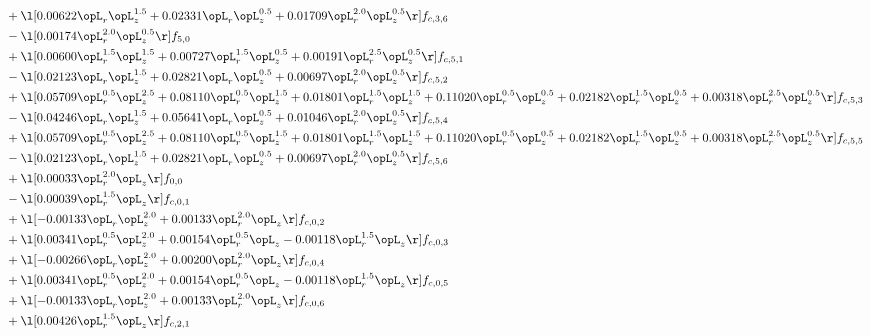 \begin{alignat}{2}
& + \l[  0.00622 \opL_r \opL_z^{1.5} +  0.02331 \opL_r \opL_z^{0.5} +  0.01709 \opL_r^{2.0} \opL_z^{0.5}  \r] f_{c,3,6} \nonumber \\ 
& - \l[  0.00174 \opL_r^{2.0} \opL_z^{0.5}  \r] f_{5,0} \nonumber \\ 
& + \l[  0.00600 \opL_r^{1.5} \opL_z^{1.5} +  0.00727 \opL_r^{1.5} \opL_z^{0.5} +  0.00191 \opL_r^{2.5} \opL_z^{0.5}  \r] f_{c,5,1} \nonumber \\ 
& - \l[  0.02123 \opL_r \opL_z^{1.5} +  0.02821 \opL_r \opL_z^{0.5} +  0.00697 \opL_r^{2.0} \opL_z^{0.5}  \r] f_{c,5,2} \nonumber \\ 
& + \l[  0.05709 \opL_r^{0.5} \opL_z^{2.5} +  0.08110 \opL_r^{0.5} \opL_z^{1.5} +  0.01801 \opL_r^{1.5} \opL_z^{1.5} +  0.11020 \opL_r^{0.5} \opL_z^{0.5} +  0.02182 \opL_r^{1.5} \opL_z^{0.5} +  0.00318 \opL_r^{2.5} \opL_z^{0.5}  \r] f_{c,5,3} \nonumber \\ 
& - \l[  0.04246 \opL_r \opL_z^{1.5} +  0.05641 \opL_r \opL_z^{0.5} +  0.01046 \opL_r^{2.0} \opL_z^{0.5}  \r] f_{c,5,4} \nonumber \\ 
& + \l[  0.05709 \opL_r^{0.5} \opL_z^{2.5} +  0.08110 \opL_r^{0.5} \opL_z^{1.5} +  0.01801 \opL_r^{1.5} \opL_z^{1.5} +  0.11020 \opL_r^{0.5} \opL_z^{0.5} +  0.02182 \opL_r^{1.5} \opL_z^{0.5} +  0.00318 \opL_r^{2.5} \opL_z^{0.5}  \r] f_{c,5,5} \nonumber \\ 
& - \l[  0.02123 \opL_r \opL_z^{1.5} +  0.02821 \opL_r \opL_z^{0.5} +  0.00697 \opL_r^{2.0} \opL_z^{0.5}  \r] f_{c,5,6} \nonumber \\ 
& + \l[  0.00033 \opL_r^{2.0} \opL_z  \r] f_{0,0} \nonumber \\ 
& - \l[  0.00039 \opL_r^{1.5} \opL_z  \r] f_{c,0,1} \nonumber \\ 
& + \l[  -0.00133 \opL_r \opL_z^{2.0} +  0.00133 \opL_r^{2.0} \opL_z  \r] f_{c,0,2} \nonumber \\ 
& + \l[  0.00341 \opL_r^{0.5} \opL_z^{2.0} +  0.00154 \opL_r^{0.5} \opL_z   -0.00118 \opL_r^{1.5} \opL_z  \r] f_{c,0,3} \nonumber \\ 
& + \l[  -0.00266 \opL_r \opL_z^{2.0} +  0.00200 \opL_r^{2.0} \opL_z  \r] f_{c,0,4} \nonumber \\ 
& + \l[  0.00341 \opL_r^{0.5} \opL_z^{2.0} +  0.00154 \opL_r^{0.5} \opL_z   -0.00118 \opL_r^{1.5} \opL_z  \r] f_{c,0,5} \nonumber \\ 
& + \l[  -0.00133 \opL_r \opL_z^{2.0} +  0.00133 \opL_r^{2.0} \opL_z  \r] f_{c,0,6} \nonumber \\ 
& + \l[  0.00426 \opL_r^{1.5} \opL_z  \r] f_{c,2,1} \nonumber \\ 

\end{alignat}
